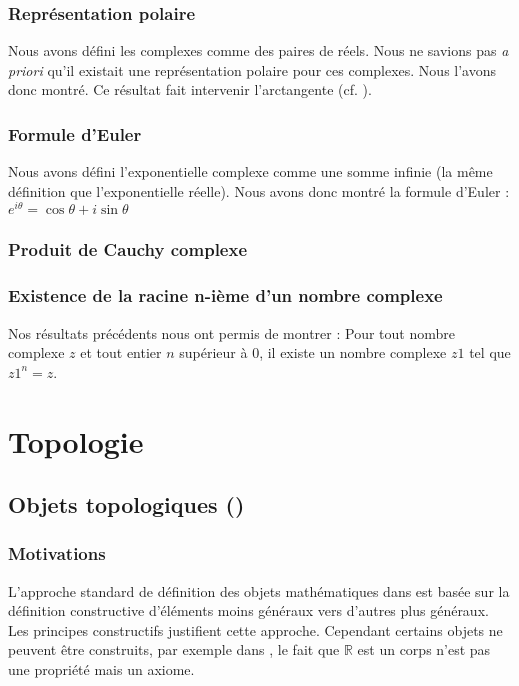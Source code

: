 \subsubsection{Représentation polaire}

Nous avons défini les complexes comme des paires de réels. Nous ne savions pas \emph{a priori} qu'il existait une représentation polaire pour ces complexes. Nous l'avons donc montré. Ce résultat fait intervenir l'arctangente (cf. ).

\subsubsection{Formule d'Euler}

Nous avons défini l'exponentielle complexe comme une somme infinie (la même définition que l'exponentielle réelle). Nous avons donc montré la formule d'Euler : $ e^{ i\theta } = \cos \theta + i\sin \theta $

\subsubsection{Produit de Cauchy complexe}%

\subsubsection{Existence de la racine n-ième d'un nombre complexe}
Nos résultats précédents nous ont permis de montrer :
Pour tout nombre complexe $z$ et tout entier $n$ supérieur à $0$, il existe un nombre complexe $z1$ tel que $z1 ^ n = z$.

\section{Topologie}

\subsection{Objets topologiques ()}

\subsubsection{Motivations}

L'approche standard de définition des objets mathématiques dans \coq{} est basée sur la définition constructive d'éléments moins généraux vers d'autres plus généraux. Les principes constructifs justifient cette approche. Cependant certains objets ne peuvent être construits, par exemple dans , le fait que $\mathbb{R}$ est un corps n'est pas une propriété mais un axiome.

